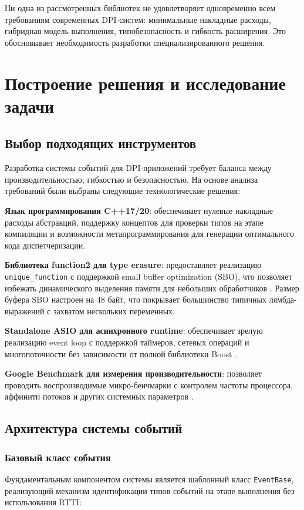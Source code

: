 \documentclass[12pt,a4paper]{report}
\begin{document}
Ни одна из рассмотренных библиотек не удовлетворяет одновременно всем требованиям современных DPI-систем: минимальные накладные расходы, гибридная модель выполнения, типобезопасность и гибкость расширения. Это обосновывает необходимость разработки специализированного решения.

\chapter{Построение решения и исследование задачи}
\section{Выбор подходящих инструментов}
Разработка системы событий для DPI-приложений требует баланса между производительностью, гибкостью и безопасностью. На основе анализа требований были выбраны следующие технологические решения:

\textbf{Язык программирования C++17/20}: обеспечивает нулевые накладные расходы абстракций, поддержку концептов для проверки типов на этапе компиляции и возможности метапрограммирования для генерации оптимального кода диспетчеризации.

\textbf{Библиотека function2 для type erasure}: предоставляет реализацию \texttt{unique\_function} с поддержкой small buffer optimization (SBO), что позволяет избежать динамического выделения памяти для небольших обработчиков \cite{function2023}. Размер буфера SBO настроен на 48 байт, что покрывает большинство типичных лямбда-выражений с захватом нескольких переменных.

\textbf{Standalone ASIO для асинхронного runtime}: обеспечивает зрелую реализацию event loop с поддержкой таймеров, сетевых операций и многопоточности без зависимости от полной библиотеки Boost \cite{asio2023}.

\textbf{Google Benchmark для измерения производительности}: позволяет проводить воспроизводимые микро-бенчмарки с контролем частоты процессора, аффинити потоков и других системных параметров \cite{googlebenchmark2023}.

\section{Архитектура системы событий}
\subsection{Базовый класс события}
Фундаментальным компонентом системы является шаблонный класс \texttt{EventBase}, реализующий механизм идентификации типов событий на этапе выполнения без использования RTTI:
\end{document}
